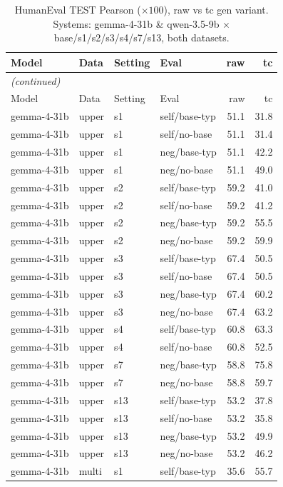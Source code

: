 {\small
\begin{longtable}{llll rr}
\caption{HumanEval TEST Pearson ($\times100$), raw vs tc gen variant. Systems: gemma-4-31b \& qwen-3.5-9b $\times$ base/s1/s2/s3/s4/s7/s13, both datasets.}\label{tab:he_test_pearson}\\
\toprule
Model & Data & Setting & Eval & raw & tc \\
\midrule
\endfirsthead
\multicolumn{6}{l}{\itshape (continued)}\\
\toprule
Model & Data & Setting & Eval & raw & tc \\
\midrule
\endhead
\bottomrule
\endfoot
gemma-4-31b & upper & s1 & self/base-typ & 51.1 & 31.8 \\
gemma-4-31b & upper & s1 & self/no-base & 51.1 & 31.4 \\
gemma-4-31b & upper & s1 & neg/base-typ & 51.1 & 42.2 \\
gemma-4-31b & upper & s1 & neg/no-base & 51.1 & 49.0 \\
gemma-4-31b & upper & s2 & self/base-typ & 59.2 & 41.0 \\
gemma-4-31b & upper & s2 & self/no-base & 59.2 & 41.2 \\
gemma-4-31b & upper & s2 & neg/base-typ & 59.2 & 55.5 \\
gemma-4-31b & upper & s2 & neg/no-base & 59.2 & 59.9 \\
gemma-4-31b & upper & s3 & self/base-typ & 67.4 & 50.5 \\
gemma-4-31b & upper & s3 & self/no-base & 67.4 & 50.5 \\
gemma-4-31b & upper & s3 & neg/base-typ & 67.4 & 60.2 \\
gemma-4-31b & upper & s3 & neg/no-base & 67.4 & 63.2 \\
gemma-4-31b & upper & s4 & self/base-typ & 60.8 & 63.3 \\
gemma-4-31b & upper & s4 & self/no-base & 60.8 & 52.5 \\
gemma-4-31b & upper & s7 & neg/base-typ & 58.8 & 75.8 \\
gemma-4-31b & upper & s7 & neg/no-base & 58.8 & 59.7 \\
gemma-4-31b & upper & s13 & self/base-typ & 53.2 & 37.8 \\
gemma-4-31b & upper & s13 & self/no-base & 53.2 & 35.8 \\
gemma-4-31b & upper & s13 & neg/base-typ & 53.2 & 49.9 \\
gemma-4-31b & upper & s13 & neg/no-base & 53.2 & 46.2 \\
\midrule
gemma-4-31b & multi & s1 & self/base-typ & 35.6 & 55.7 \\

\end{longtable}}
